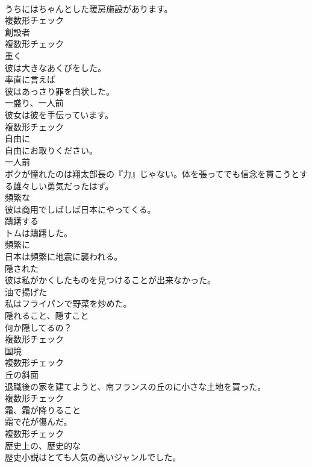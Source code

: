 \documentclass[8pt]{extreport}
\begin{document}
\begin{CJK}{UTF8}{min}
\\	うちにはちゃんとした暖房施設があります。	
\\	複数形チェック
\\	[名詞]	創設者	
\\	複数形チェック
\\	[副詞]	重く	
\\	彼は大きなあくびをした。	
\\	[副詞]	率直に言えば	
\\	彼はあっさり罪を白状した。	
\\	[名詞]	一盛り、一人前	
\\	彼女は彼を手伝っています。	
\\	複数形チェック
\\	[副詞]	自由に	
\\	自由にお取りください。	
\\	[形容詞]	一人前	
\\	ボクが憧れたのは翔太部長の『力』じゃない。体を張ってでも信念を貫こうとする雄々しい勇気だったはず。	
\\	[形容詞]	頻繁な	
\\	彼は商用でしばしば日本にやってくる。	
\\	[動詞]	躊躇する	
\\	トムは躊躇した。	
\\	[副詞]	頻繁に	
\\	日本は頻繁に地震に襲われる。	
\\	[形容詞]	隠された	
\\	彼は私がかくしたものを見つけることが出来なかった。	
\\	[形容詞]	油で揚げた	
\\	私はフライパンで野菜を炒めた。	
\\	[名詞]	隠れること、隠すこと	
\\	何か隠してるの？	
\\	複数形チェック
\\	[名詞]	国境	
\\	複数形チェック
\\	[名詞]	丘の斜面	
\\	退職後の家を建てようと、南フランスの丘のに小さな土地を買った。	
\\	複数形チェック
\\	[名詞]	霜、霜が降りること	
\\	霜で花が傷んだ。	
\\	複数形チェック
\\	[形容詞]	歴史上の、歴史的な	
\\	歴史小説はとても人気の高いジャンルでした。	

\end{CJK}
\end{document}
